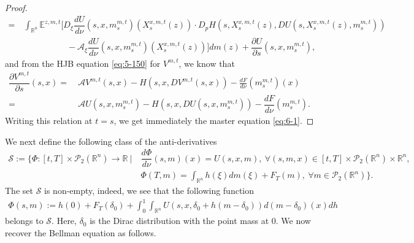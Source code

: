 \documentclass[11pt]{article}
\numberwithin{equation}{section}
\newcommand{\e}{\mathbb{E}}
\newcommand{\br}{\mathbb{R}}
\newcommand{\pr}{\mathcal{P}}
\newcommand{\brn}{{\mathbb{R}^n}}
\newcommand{\1}{\mbox{1\hspace{-1mm}I}}
\begin{document}
\begin{proof}
\begin{align*}
    =\ &  \int_{\brn}\e^{z,m,t}\bigg[ D_{\xi}\dfrac{dU}{d\nu}\left(s,x,m^{m,t}_s\right)\left(X^{x,m,t}_s(z)\right)\cdot D_p H\left(s,X^{x,m,t}_s(z),DU\left(s,X^{x,m,t}_s(z),m^{m,t}_s\right)\right)\\
    &\quad\qquad\qquad -\mathcal{A}_{\xi}\dfrac{dU}{d\nu}\left(s,x,m^{m,t}_s\right)\left(X^{x,m,t}_s(z)\right)\bigg]dm(z)+\dfrac{\partial U}{\partial s}\left(s,x,m^{m,t}_s\right),
\end{align*}
and from the HJB equation \eqref{eq:5-150} for $V^{m,t}$, we know that
\begin{align*}%
    \dfrac{\partial V^{m,t}}{\partial s}(s,x)=\ & \mathcal{A}V^{m,t}(s,x)-H\left(s,x,DV^{m,t}(s,x)\right)-\frac{dF}{d\nu}\left(m^{m,t}_s\right)(x)\\
    =\ & \mathcal{A}U\left(s,x,m^{m,t}_s\right)-H\left(s,x,DU\left(s,x,m^{m,t}_s\right)\right)-\dfrac{dF}{d\nu}\left(m^{m,t}_s\right).
\end{align*}
Writing this relation at $t=s$, we get immediately the master equation \eqref{eq:6-1}.
\end{proof}

We next define the following class of the anti-derivatives 
\begin{equation}\label{eq:6-4}
\begin{aligned}
    \mathcal{S}:=\bigg\{ \Phi:[t,T]\times\pr_2(\brn)\to\br \ \bigg| \ & \dfrac{d\Phi}{d\nu}(s,m)(x)=U(s,x,m), \ \forall (s,m,x)\in [t,T]\times\pr_2(\brn)\times\brn, \\
    &\Phi(T,m)=\int_{\brn}h(\xi)dm(\xi)+F_{T}(m),\ \forall m \in  \pr_2(\brn) \bigg\}.
\end{aligned}
\end{equation}
The set $\mathcal{S}$ is non-empty, indeed, we see that the following function
\begin{align*}
    \Phi(s,m):=h(0)+F_T(\delta_0)+\int_0^1\int_\brn  U\left(s,x,\delta_0+h (m-\delta_0)\right)d(m-\delta_0)(x) dh
\end{align*}
belongs to $\mathcal{S}$. Here, $\delta_0$ is the Dirac distribution with the point mass at $0$. We now recover the Bellman equation as follows. 

\end{document}
